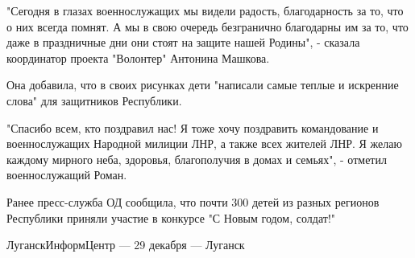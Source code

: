 "Сегодня в глазах военнослужащих мы видели радость, благодарность за то, что о
них всегда помнят. А мы в свою очередь безгранично благодарны им за то, что
даже в праздничные дни они стоят на защите нашей Родины", - сказала координатор
проекта "Волонтер" Антонина Машкова.

Она добавила, что в своих рисунках дети "написали самые теплые и искренние
слова" для защитников Республики.

"Спасибо всем, кто поздравил нас! Я тоже хочу поздравить командование и
военнослужащих Народной милиции ЛНР, а также всех жителей ЛНР. Я желаю каждому
мирного неба, здоровья, благополучия в домах и семьях", - отметил
военнослужащий Роман.

Ранее пресс-служба ОД сообщила, что почти 300 детей из разных регионов
Республики приняли участие в конкурсе "С Новым годом, солдат!"

ЛуганскИнформЦентр — 29 декабря — Луганск


